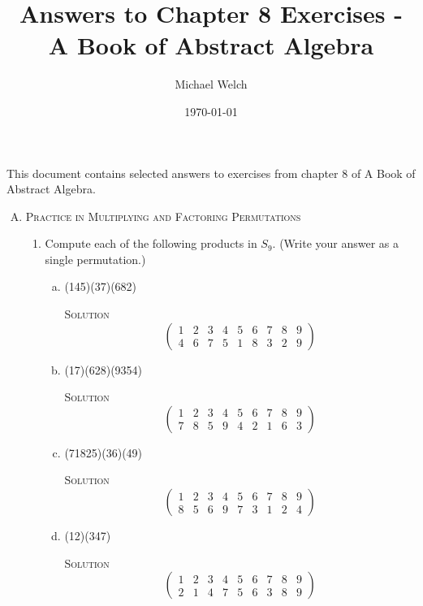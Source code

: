 \documentclass[twoside]{amsart}
\newcommand{\solution}{\textsc{Solution}\xspace}
\begin{document}
\title{Answers to Chapter 8 Exercises - A Book of Abstract Algebra}
\author{Michael Welch}
\date{\today}
\maketitle

This document contains selected answers to exercises from chapter 8
of A Book of Abstract Algebra.


\begin{enumerate}[A.]
   \item \textsc{Practice in Multiplying and Factoring Permutations}
   \begin{enumerate}[1]
      \item Compute each of the following products in $S_9$. (Write your
      answer as a single permutation.)

      \begin{enumerate}[(a)]
         \item (145)(37)(682)

	 \solution \[ \begin{pmatrix}
	                 1 & 2 & 3 & 4 & 5 & 6 & 7 & 8 & 9 \\
			 4 & 6 & 7 & 5 & 1 & 8 & 3 & 2 & 9
	              \end{pmatrix} \]

	 \item (17)(628)(9354)
	 
	 \solution \[
	              \begin{pmatrix}
	                 1 & 2 & 3 & 4 & 5 & 6 & 7 & 8 & 9 \\
			 7 & 8 & 5 & 9 & 4 & 2 & 1 & 6 & 3
		      \end{pmatrix}
		   \]

	 \item (71825)(36)(49)

	 \solution \[
	              \begin{pmatrix}
	                 1 & 2 & 3 & 4 & 5 & 6 & 7 & 8 & 9 \\
			 8 & 5 & 6 & 9 & 7 & 3 & 1 & 2 & 4
		      \end{pmatrix}
	           \]
	 
	 \item (12)(347)

	 \solution \[
	              \begin{pmatrix}
	                 1 & 2 & 3 & 4 & 5 & 6 & 7 & 8 & 9 \\
			 2 & 1 & 4 & 7 & 5 & 6 & 3 & 8 & 9
		      \end{pmatrix}
	           \]


\end{enumerate}
\end{enumerate}
\end{enumerate}
\end{document}
